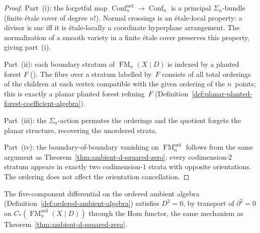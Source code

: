\begin{proof}
Part~(i): the forgetful map
$\operatorname{Conf}_n^{\mathrm{ord}} \to
\operatorname{Conf}_n$ is a principal $\Sigma_n$-bundle
(finite \'etale cover of degree $n!$).
Normal crossings is an \'etale-local property: a divisor
is snc iff it is \'etale-locally a coordinate hyperplane
arrangement.  The normalization of a smooth variety in a
finite \'etale cover preserves this property,
giving part~(i).

Part~(ii): each boundary stratum of
$\operatorname{FM}_n(X \mathbin{|} D)$ is indexed by a
planted forest $F$
(\cite[Theorem~3.3.1(2)]{Mok25}).  The fibre over a
stratum labelled by~$F$ consists of all total orderings of
the children at each vertex compatible with the given
ordering of the $n$~points; this is exactly a planar
planted forest refining~$F$
(Definition~\ref{def:planar-planted-forest-coefficient-algebra}).

Part~(iii): the $\Sigma_n$-action permutes the
orderings and the quotient forgets the planar structure,
recovering the unordered strata.

Part~(iv): the boundary-of-boundary vanishing on
$\operatorname{FM}_n^{\mathrm{ord}}$ follows from the
same argument as
Theorem~\ref{thm:ambient-d-squared-zero}: every
codimension-$2$ stratum appears in exactly two
codimension-$1$ strata with opposite orientations.
The ordering does not affect the orientation
cancellation.
\end{proof}

\begin{corollary}[$E_1$ ambient $D^2 = 0$]
\label{cor:e1-ambient-d-squared-zero}
\ClaimStatusProvedHere
{}
The five-component differential on the ordered ambient
algebra
\textup{(}Definition~\textup{\ref{def:ordered-ambient-algebra}}\textup{)}
satisfies $D^2 = 0$, by transport of $\partial^2 = 0$ on
$C_*(\operatorname{FM}_n^{\mathrm{ord}}(X \mathbin{|} D))$
through the Hom functor, the same mechanism as
Theorem~\textup{\ref{thm:ambient-d-squared-zero}}.
\end{corollary}

